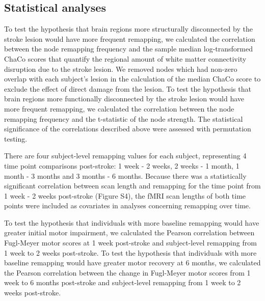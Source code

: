 \documentclass[phd,tocprelim]{cornell}
\begin{document}
	\subsection{Statistical analyses}
	To test the hypothesis that brain regions more structurally disconnected by the stroke lesion would have more frequent remapping, we calculated the correlation between the node remapping frequency and the sample median log-transformed ChaCo scores that quantify the regional amount of white matter connectivity disruption due to the stroke lesion. We removed nodes which had non-zero overlap with each subject's lesion in the calculation of the median ChaCo score to exclude the effect of direct damage from the lesion. To test the hypothesis that brain regions more functionally disconnected by the stroke lesion would have more frequent remapping, we calculated the correlation between the node remapping frequency and the t-statistic of the node strength. The statistical significance of the correlations described above were assessed with permutation testing. 
	
	There are four subject-level remapping values for each subject, representing 4 time point comparisons post-stroke: 1 week - 2 weeks, 2 weeks - 1 month, 1 month - 3 months and 3 months - 6 months. Because there was a statistically significant correlation between scan length and remapping for the time point from 1 week - 2 weeks post-stroke (Figure S4), the fMRI scan lengths of both time points were included as covariates in analyses concerning remapping over time. 
	
	To test the hypothesis that individuals with more baseline remapping would have greater initial motor impairment, we calculated the Pearson correlation between Fugl-Meyer motor scores at 1 week post-stroke and subject-level remapping from 1 week to 2 weeks post-stroke. To test the hypothesis that individuals with more baseline remapping would have greater motor recovery at 6 months, we calculated the Pearson correlation between the change in Fugl-Meyer motor scores from 1 week to 6 months post-stroke and subject-level remapping from 1 week to 2 weeks post-stroke. 
	
\end{document}
